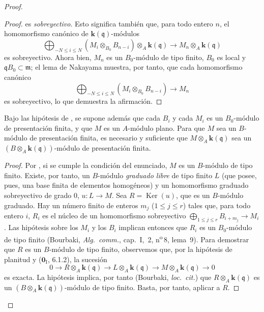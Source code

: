\begin{proof}
\begin{proof}
es \emph{sobreyectivo}. Esto significa también que, para todo entero $n$, el
homomorfismo canónico de $\boldsymbol{k}(\mathfrak q)$-módulos
\[
\bigoplus_{-N\leq i\leq N}(M_i\otimes_{B_0}B_{n-i})
\otimes_A\boldsymbol{k}(\mathfrak q)\longrightarrow M_n\otimes_A\boldsymbol{k}(\mathfrak q)
\]
es sobreyectivo. Ahora bien, $M_n$ es un
$B_0$-módulo de tipo finito, $B_0$ es local y
$\mathfrak qB_0\subset\mathfrak m$; el lema de Nakayama
muestra, por tanto, que cada homomorfismo canónico
\[
\bigoplus_{-N\leq i\leq N}(M_i\otimes_{B_0}B_{n-i})\longrightarrow M_n
\]
es sobreyectivo, lo que demuestra la afirmación.
\end{proof}

\begin{corollary}[11.2.9.4]
\label{IV.11.2.9.4}
Bajo las hipótesis de , se supone además que cada $B_i$ y cada $M_i$ es un $B_0$-módulo de presentación finita, y que $M$ es un $A$-módulo plano. Para que $M$ sea un $B$-módulo de presentación finita, es necesario y suficiente que $M\otimes_A\boldsymbol{k}(\mathfrak q)$ sea un $(B\otimes_A\boldsymbol{k}(\mathfrak q))$-módulo de presentación finita.
\end{corollary}

\begin{proof}
Por , si se cumple la condición del enunciado,
$M$ es un $B$-módulo de tipo finito. Existe, por tanto, un
$B$-módulo \emph{graduado libre} de tipo finito $L$ (que posee,
pues, una base finita de elementos homogéneos) y un homomorfismo graduado
sobreyectivo de grado 0,
$u:L\to M$.
Sea $R=\operatorname{Ker}(u)$, que es un
$B$-módulo graduado. Hay un número finito de enteros $m_j$
($1\leq j\leq r$) tales que, para todo entero $i$,
$R_i$ es el núcleo de un homomorfismo sobreyectivo
$\bigoplus_{1\leq j\leq r}B_{i+m_j}\longrightarrow M_i$.
Las hipótesis sobre los $M_i$ y los $B_i$ implican entonces
que $R_i$ es un $B_0$-módulo de tipo finito
(Bourbaki, \emph{Alg.\ comm.}, cap.~I,
\textsection\,2, n\textsuperscript{o}\,8, lema~9). Para demostrar que
$R$ es un $B$-módulo de tipo finito, observemos que,
por la hipótesis de planitud y ($\mathbf 0_{\mathrm I}$, 6.1.2), la
sucesión
\[
0\longrightarrow R\otimes_A\boldsymbol{k}(\mathfrak q)
\longrightarrow L\otimes_A\boldsymbol{k}(\mathfrak q)
\longrightarrow M\otimes_A\boldsymbol{k}(\mathfrak q)\longrightarrow0
\]
es exacta. La hipótesis implica, por tanto (Bourbaki,
\emph{loc.\ cit.}) que
$R\otimes_A\boldsymbol{k}(\mathfrak q)$ es un
$(B\otimes_A\boldsymbol{k}(\mathfrak q))$-módulo
de tipo finito. Basta, por tanto, aplicar  a $R$.
\end{proof}


\end{proof}
